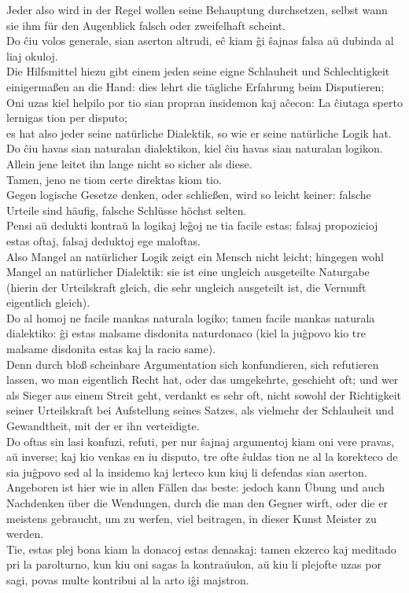 \documentclass{book}
\newcommand{\de}[1]{{\color{red}#1}\\}
\newcommand{\eo}[1]{#1\\}
\newcommand{\eble}[1]{{\color{blue}#1}}
\begin{document}
\de{Jeder also wird in der Regel wollen seine Behauptung durchsetzen,
selbst wann sie ihm für den Augenblick falsch oder zweifelhaft scheint.}
\eo{Do ĉiu volos generale, sian aserton altrudi, eĉ kiam ĝi ŝajnas falsa
aŭ dubinda al liaj okuloj.}
\de{Die Hilfsmittel hiezu gibt einem jeden seine eigne Schlauheit und
Schlechtigkeit einigermaßen an die Hand: dies lehrt die tägliche
Erfahrung beim Disputieren;}
\eo{Oni uzas kiel helpilo por tio sian propran \eble{insidemon} kaj
aĉecon: La ĉiutaga sperto lernigas tion per disputo;}
\de{es hat also jeder seine natürliche Dialektik, so wie er seine
natürliche Logik hat. }
\eo{Do ĉiu havas sian naturalan dialektikon, kiel ĉiu havas sian
naturalan logikon.}
\de{Allein jene leitet ihn lange nicht so sicher als diese. }
\eo{Tamen, jeno ne tiom certe direktas kiom tio.}
\de{Gegen logische Gesetze denken, oder schließen, wird so leicht keiner:
falsche Urteile sind häufig, falsche Schlüsse höchst selten. }
\eo{Pensi aŭ dedukti kontraŭ la logikaj leĝoj ne tia facile
estas: falsaj propozicioj estas oftaj, falsaj deduktoj ege
maloftas.}
\de{Also Mangel an natürlicher Logik zeigt ein Mensch nicht leicht;
hingegen wohl Mangel an natürlicher Dialektik: sie ist eine ungleich
ausgeteilte Naturgabe (hierin der Urteilskraft gleich, die sehr ungleich
ausgeteilt ist, die Vernunft eigentlich gleich). }
\eo{Do al homoj ne facile mankas \eble{naturala} logiko; tamen facile mankas
\eble{naturala} dialektiko: ĝi estas malsame disdonita naturdonaco
(kiel la juĝpovo kio tre \eble{malsame} disdonita estas kaj la racio
\eble{same}).}
\de{Denn durch bloß scheinbare Argumentation sich konfundieren, sich
refutieren lassen, wo man eigentlich Recht hat, oder das umgekehrte,
geschieht oft; und wer als Sieger aus einem Streit geht, verdankt es sehr
oft, nicht sowohl der Richtigkeit seiner Urteilskraft bei Aufstellung
seines Satzes, als vielmehr der Schlauheit und Gewandtheit, mit der er
ihn verteidigte. }
\eo{Do oftas sin \eble{lasi} konfuzi, refuti, per nur ŝajnaj
argumentoj kiam oni vere pravas, aŭ inverse; kaj kio venkas en iu
disputo, tre ofte ŝuldas tion ne al la korekteco de sia \eble{juĝpovo}
sed al la insidemo kaj lerteco kun kiuj li defendas sian aserton.}
\de{Angeboren ist hier wie in allen Fällen das beste: jedoch kann Übung
und auch Nachdenken über die Wendungen, durch die man den Gegner wirft,
oder die er meistens gebraucht, um zu werfen, viel beitragen, in dieser
Kunst Meister zu werden. }
\eo{Tie, estas plej bona kiam la donacoj estas denaskaj: tamen ekzerco
kaj meditado pri la parolturno, kun kiu oni sagas la kontraŭulon, aŭ kiu
li plejofte uzas por sagi, povas multe kontribui al la arto iĝi
majstron.}
\end{document}
